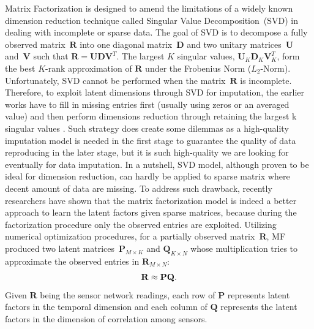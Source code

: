 Matrix Factorization is designed to amend the limitations of a widely known dimension reduction technique called Singular Value Decomposition~(SVD) in dealing with incomplete or sparse data.
The goal of SVD is to decompose a fully observed matrix~$\mathbf{R}$ into one diagonal matrix~$\mathbf{D}$ and two unitary matrices~$\mathbf{U}$ and~$\mathbf{V}$ such that
$\mathbf{R} = \mathbf{U}\mathbf{D}\mathbf{V}^T.$ %
The largest $K$ singular values, $\mathbf{U}_K \mathbf{D}_K \mathbf{V}_K^T$, form the best $K$-rank approximation of $\mathbf{R}$ under the Frobenius Norm ($L_2$-Norm). Unfortunately, SVD cannot be performed when the matrix~$\mathbf{R}$ is incomplete. Therefore, to exploit latent dimensions through SVD for imputation, the earlier works have to fill in missing entries first (usually using zeros or an averaged value) and then perform dimensions reduction through retaining the largest k singular values \cite{beckers2003eof}. Such strategy does create some dilemmas as a high-quality imputation model is needed in the first stage to guarantee the quality of data reproducing in the later stage, but it is such high-quality we are looking for eventually for data imputation. In a nutshell, SVD model, although proven to be ideal for dimension reduction, can hardly be applied to sparse matrix where decent amount of data are missing.
To address such drawback, recently researchers have shown \cite{koren2009matrix} that the matrix factorization model is indeed a better approach to learn the latent factors given sparse matrices, because during the factorization procedure only the observed entries are exploited.
Utilizing numerical optimization procedures, for a partially observed matrix~$\mathbf{R}$, MF produced two latent matrices~$\mathbf{P}_{M \times K}$ and $\mathbf{Q}_{K \times N}$ whose multiplication tries to approximate the observed entries in $\mathbf{R}_{M \times N}$:
\begin{equation*}\small \mathbf{R} \approx \mathbf{P} \mathbf{Q}.\end{equation*}
Given $\mathbf{R}$ being the sensor network readings, each row of $\mathbf{P}$ represents latent factors in the temporal dimension and each column of $\mathbf{Q}$ represents the latent factors in the dimension of correlation among sensors.

